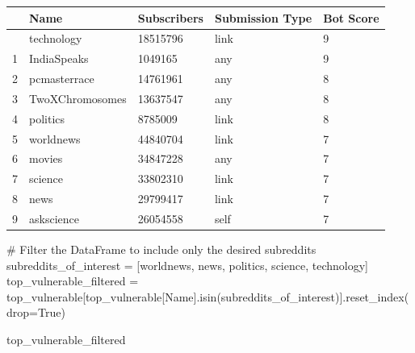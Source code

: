 \documentclass[
  12pt,
  letterpaper,
  DIV=11,
  numbers=noendperiod]{scrartcl}
\newenvironment{Shaded}{\begin{snugshade}}{\end{snugshade}}
\newcommand{\CommentTok}[1]{\textcolor[rgb]{0.37,0.37,0.37}{#1}}
\newcommand{\NormalTok}[1]{\textcolor[rgb]{0.00,0.23,0.31}{#1}}
\newcommand{\OperatorTok}[1]{\textcolor[rgb]{0.37,0.37,0.37}{#1}}
\newcommand{\StringTok}[1]{\textcolor[rgb]{0.13,0.47,0.30}{#1}}
\newcommand{\VariableTok}[1]{\textcolor[rgb]{0.07,0.07,0.07}{#1}}
\begin{document}
\begin{longtable}[]{@{}lllll@{}}
\toprule\noalign{}
& Name & Subscribers & Submission Type & Bot Score \\
\midrule\noalign{}
\endhead
\bottomrule\noalign{}
\endlastfoot
0 & technology & 18515796 & link & 9 \\
1 & IndiaSpeaks & 1049165 & any & 9 \\
2 & pcmasterrace & 14761961 & any & 8 \\
3 & TwoXChromosomes & 13637547 & any & 8 \\
4 & politics & 8785009 & link & 8 \\
5 & worldnews & 44840704 & link & 7 \\
6 & movies & 34847228 & any & 7 \\
7 & science & 33802310 & link & 7 \\
8 & news & 29799417 & link & 7 \\
9 & askscience & 26054558 & self & 7 \\
\end{longtable}

\begin{Shaded}
\begin{Highlighting}[]
\CommentTok{\# Filter the DataFrame to include only the desired subreddits}
\NormalTok{subreddits\_of\_interest }\OperatorTok{=}\NormalTok{ [}\StringTok{\textquotesingle{}worldnews\textquotesingle{}}\NormalTok{, }\StringTok{\textquotesingle{}news\textquotesingle{}}\NormalTok{, }\StringTok{\textquotesingle{}politics\textquotesingle{}}\NormalTok{, }\StringTok{\textquotesingle{}science\textquotesingle{}}\NormalTok{, }\StringTok{\textquotesingle{}technology\textquotesingle{}}\NormalTok{]}
\NormalTok{top\_vulnerable\_filtered }\OperatorTok{=}\NormalTok{ top\_vulnerable[top\_vulnerable[}\StringTok{\textquotesingle{}Name\textquotesingle{}}\NormalTok{].isin(subreddits\_of\_interest)].reset\_index(drop}\OperatorTok{=}\VariableTok{True}\NormalTok{)}

\NormalTok{top\_vulnerable\_filtered}
\end{Highlighting}
\end{Shaded}
\end{document}

